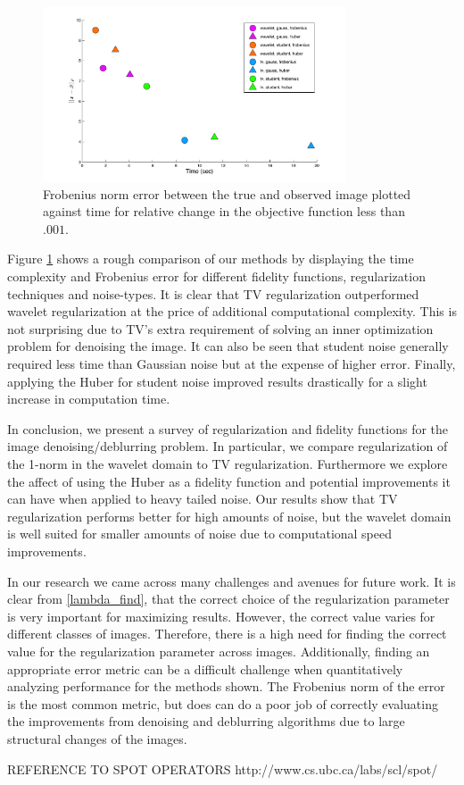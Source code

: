 \documentclass[10pt,a4paper]{article}
\begin{document}
	\begin{figure}[H]
		
		\begin{center}
			\includegraphics[width=0.8\textwidth]{../figures/comparePlot2.pdf}
			\caption{ Frobenius norm error between the true and observed image plotted against time for relative change in the objective function less than $.001$. }
			\label{comp_methods}
		\end{center}
	\end{figure}
	
	
	Figure \ref{comp_methods} shows a rough comparison of our methods by displaying the time complexity and Frobenius error for different fidelity functions, regularization techniques and noise-types. It is clear that TV regularization outperformed wavelet regularization at the price of additional computational complexity. This is not surprising due to TV's extra requirement of solving an inner optimization problem for denoising the image. It can also be seen that student noise generally required less time than Gaussian noise but at the expense of higher error. Finally, applying the Huber for student noise improved results drastically for a slight increase in computation time.  
	
	In conclusion, we present a survey of regularization and fidelity functions for the image denoising/deblurring problem. In particular, we compare regularization of the 1-norm in the wavelet domain to TV regularization. Furthermore we explore the affect of using the Huber as a fidelity function and potential improvements it can have when applied to heavy tailed noise. Our results show that TV regularization performs better for high amounts of noise, but the wavelet domain is well suited for smaller amounts of noise due to computational speed improvements. 
	
	In our research we came across many challenges and avenues for future work. It is clear from \ref{lambda_find}, that the correct choice of the regularization parameter is very important for maximizing results. However, the correct value varies for different classes of images. Therefore, there is a high need for finding the correct value for the regularization parameter across images. Additionally, finding an appropriate error metric can be a difficult challenge when quantitatively analyzing performance for the methods shown. The Frobenius norm of the error is the most common metric, but does can do a poor job of correctly evaluating the improvements from denoising and deblurring algorithms due to large structural changes of the images. 
	
	
	
	
	
	
	
	
	REFERENCE TO SPOT OPERATORS http://www.cs.ubc.ca/labs/scl/spot/
	
	
\end{document}
